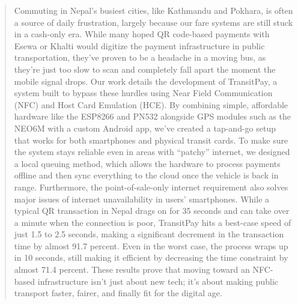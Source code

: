 \documentclass[sigconf, nonacm]{acmart}
\begin{document}
\begin{abstract}
Commuting in Nepal’s busiest cities, like Kathmandu and Pokhara, is often a source of daily frustration, largely because our fare systems are still stuck in a cash-only era. While many hoped QR code-based payments with Esewa or Khalti would digitize the payment infrastructure in public transportation, they’ve proven to be a headache in a moving bus, as they’re just too slow to scan and completely fall apart the moment the mobile signal drops. Our work details the development of TransitPay, a system built to bypass these hurdles using Near Field Communication (NFC) and Host Card Emulation (HCE). By combining simple, affordable hardware like the ESP8266 and PN532 alongside GPS modules such as the NEO6M with a custom Android app, we’ve created a tap-and-go setup that works for both smartphones and physical transit cards. To make sure the system stays reliable even in areas with “patchy” internet, we designed a local queuing method, which allows the hardware to process payments offline and then sync everything to the cloud once the vehicle is back in range. Furthermore, the point-of-sale-only internet requirement also solves major issues of internet unavailability in users' smartphones. While a typical QR transaction in Nepal drags on for 35 seconds and can take over a minute when the connection is poor, TransitPay hits a best-case speed of just 1.5 to 2.5 seconds, making a significant decrement in the transaction time by almost 91.7 percent. Even in the worst case, the process wraps up in 10 seconds, still making it efficient by decreasing the time constraint by almost 71.4 percent. These results prove that moving toward an NFC-based infrastructure isn’t just about new tech; it’s about making public transport faster, fairer, and finally fit for the digital age.

\end{abstract}



\end{document}
